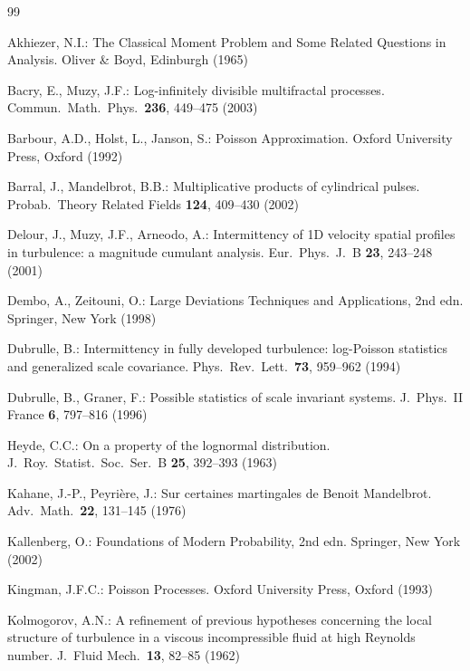 \documentclass[pdflatex,sn-mathphys-num]{sn-jnl}
\theoremstyle{thmstyleone}
\theoremstyle{thmstyletwo}
\theoremstyle{thmstylethree}
\begin{document}
\begin{thebibliography}{99}

Akhiezer, N.I.:
The Classical Moment Problem and Some Related Questions in
Analysis.
Oliver \& Boyd, Edinburgh (1965)

Bacry, E., Muzy, J.F.:
Log-infinitely divisible multifractal processes.
Commun.\ Math.\ Phys.\ \textbf{236}, 449--475 (2003)

Barbour, A.D., Holst, L., Janson, S.:
Poisson Approximation.
Oxford University Press, Oxford (1992)

Barral, J., Mandelbrot, B.B.:
Multiplicative products of cylindrical pulses.
Probab.\ Theory Related Fields \textbf{124}, 409--430 (2002)

Delour, J., Muzy, J.F., Arneodo, A.:
Intermittency of 1D velocity spatial profiles in turbulence: a
magnitude cumulant analysis.
Eur.\ Phys.\ J.\ B \textbf{23}, 243--248 (2001)

Dembo, A., Zeitouni, O.:
Large Deviations Techniques and Applications, 2nd edn.
Springer, New York (1998)

Dubrulle, B.:
Intermittency in fully developed turbulence: log-Poisson statistics
and generalized scale covariance.
Phys.\ Rev.\ Lett.\ \textbf{73}, 959--962 (1994)

Dubrulle, B., Graner, F.:
Possible statistics of scale invariant systems.
J.\ Phys.\ II France \textbf{6}, 797--816 (1996)

Heyde, C.C.:
On a property of the lognormal distribution.
J.\ Roy.\ Statist.\ Soc.\ Ser.\ B \textbf{25}, 392--393 (1963)

Kahane, J.-P., Peyri\`ere, J.:
Sur certaines martingales de Benoit Mandelbrot.
Adv.\ Math.\ \textbf{22}, 131--145 (1976)

Kallenberg, O.:
Foundations of Modern Probability, 2nd edn.
Springer, New York (2002)

Kingman, J.F.C.:
Poisson Processes.
Oxford University Press, Oxford (1993)

Kolmogorov, A.N.:
A refinement of previous hypotheses concerning the local structure of
turbulence in a viscous incompressible fluid at high Reynolds number.
J.\ Fluid Mech.\ \textbf{13}, 82--85 (1962)


\end{thebibliography}
\end{document}

